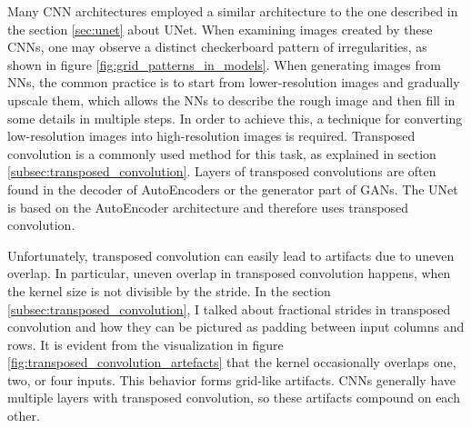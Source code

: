Many \gls{CNN} architectures employed a similar architecture to the one described in the section \ref{sec:unet} about UNet. When examining images created by these \glspl{CNN}, one may observe a distinct checkerboard pattern of irregularities, as shown in figure \ref{fig:grid_patterns_in_models}. When generating images from \glspl{NN}, the common practice is to start from lower-resolution images and gradually upscale them, which allows the \glspl{NN} to describe the rough image and then fill in some details in multiple steps. In order to achieve this, a technique for converting low-resolution images into high-resolution images is required. Transposed convolution is a commonly used method for this task, as explained in section \ref{subsec:transposed_convolution}. Layers of transposed convolutions are often found in the decoder of AutoEncoders or the generator part of \glspl{GAN}. The UNet is based on the AutoEncoder architecture and therefore uses transposed convolution.

Unfortunately, transposed convolution can easily lead to artifacts due to uneven overlap. In particular, uneven overlap in transposed convolution happens, when the kernel size is not divisible by the stride. In the section \ref{subsec:transposed_convolution}, I talked about fractional strides in transposed convolution and how they can be pictured as padding between input columns and rows. It is evident from the visualization in figure \ref{fig:transposed_convolution_artefacts} that the kernel occasionally overlaps one, two, or four inputs. This behavior forms grid-like artifacts. \glspl{CNN} generally have multiple layers with transposed convolution, so these artifacts compound on each other. \cite{deconvolutionbias}

